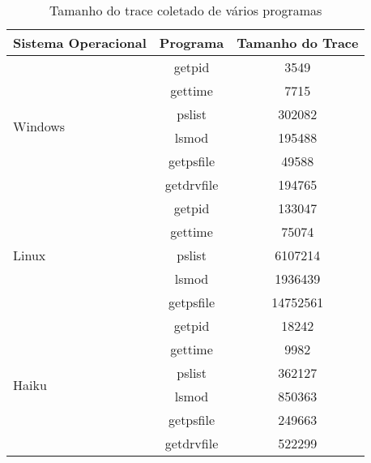 \documentclass[
	12pt,				%
	openright,			%
	oneside,			%
	a4paper,			%
	english,			%
	french,				%
	spanish,			%
	brazil,				%
	]{abntex2}
\begin{document}
\begin{itemize}
\begin{table}[]
\centering
\caption{Tamanho do trace coletado de vários programas}
\label{my-label}
\begin{tabular}{l|c|c}
\hline
\textbf{Sistema Operacional}		&\textbf{Programa}	      & \textbf{Tamanho do Trace}\\ \hline
\multirow{6}{*}{Windows}                & getpid                      & 3549			 \\
                                        & gettime                     & 7715    		 \\
                                        & pslist                      & 302082  		 \\
                                        & lsmod                       & 195488   		 \\
                                        & getpsfile                   & 49588   		 \\
                                        & getdrvfile                  & 194765  		 \\
\multirow{5}{*}{Linux}                  & getpid                      & 133047                   \\ \hline
                                        & gettime                     & 75074                    \\
                                        & pslist                      & 6107214                  \\
                                        & lsmod                       & 1936439                  \\
                                        & getpsfile                   & 14752561                 \\
\multirow{6}{*}{Haiku}                  & getpid                      & 18242                    \\ \hline
                                        & gettime                     & 9982                     \\
                                        & pslist                      & 362127                   \\
                                        & lsmod                       & 850363                   \\
                                        & getpsfile                   & 249663                   \\
                                        & getdrvfile                  & 522299                   \\ 
\end{tabular}
\end{table}


\end{itemize}
\end{document}
